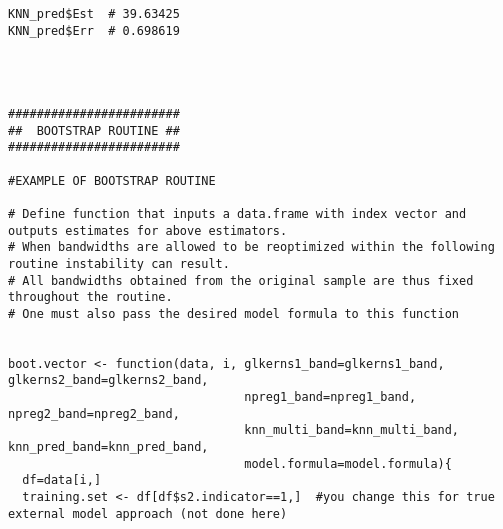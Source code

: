 \documentclass[a4paper,12pt,leqno, titlepage]{article}
\begin{document}
\begin{appendix}
{{{{\begin{verbatim}
KNN_pred$Est  # 39.63425
KNN_pred$Err  # 0.698619




########################
##  BOOTSTRAP ROUTINE ##
########################

#EXAMPLE OF BOOTSTRAP ROUTINE

# Define function that inputs a data.frame with index vector and outputs estimates for above estimators.
# When bandwidths are allowed to be reoptimized within the following routine instability can result.
# All bandwidths obtained from the original sample are thus fixed throughout the routine.
# One must also pass the desired model formula to this function


boot.vector <- function(data, i, glkerns1_band=glkerns1_band, glkerns2_band=glkerns2_band,
                                 npreg1_band=npreg1_band, npreg2_band=npreg2_band,
                                 knn_multi_band=knn_multi_band, knn_pred_band=knn_pred_band,
                                 model.formula=model.formula){
  df=data[i,]
  training.set <- df[df$s2.indicator==1,]  #you change this for true external model approach (not done here)


\end{verbatim}}}}}
\end{appendix}
\end{document}

